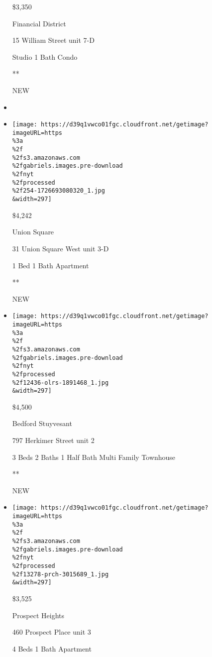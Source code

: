 \begin{itemize}
  \$3,350

  Financial District

  15 William Street unit 7-D

  Studio \textbar{} 1 Bath \textbar{} Condo

  **

  NEW
\item
\item
  \href{/real-estate/usa/ny/new-york/union-square/homes-for-rent/31-union-square-west/254-1726693080320?}{}

  \texttt{[image: https://d39q1vwco01fgc.cloudfront.net/getimage?imageURL=https\\\%3a\\\%2f\\\%2fs3.amazonaws.com\\\%2fgabriels.images.pre-download\\\%2fnyt\\\%2fprocessed\\\%2f254-1726693080320\_1.jpg\\\&width=297]}

  \$4,242

  Union Square

  31 Union Square West unit 3-D

  1 Bed \textbar{} 1 Bath \textbar{} Apartment

  **

  NEW
\item
  \href{/real-estate/usa/ny/brooklyn/bedford-stuyvesant/homes-for-rent/797-herkimer-street/12436-OLRS-1891468?}{}

  \texttt{[image: https://d39q1vwco01fgc.cloudfront.net/getimage?imageURL=https\\\%3a\\\%2f\\\%2fs3.amazonaws.com\\\%2fgabriels.images.pre-download\\\%2fnyt\\\%2fprocessed\\\%2f12436-olrs-1891468\_1.jpg\\\&width=297]}

  \$4,500

  Bedford Stuyvesant

  797 Herkimer Street unit 2

  3 Beds \textbar{} 2 Baths \textbar{} 1 Half Bath \textbar{} Multi
  Family Townhouse

  **

  NEW
\item
  \href{/real-estate/usa/ny/brooklyn/prospect-heights/homes-for-rent/460-prospect-place/13278-PRCH-3015689?}{}

  \texttt{[image: https://d39q1vwco01fgc.cloudfront.net/getimage?imageURL=https\\\%3a\\\%2f\\\%2fs3.amazonaws.com\\\%2fgabriels.images.pre-download\\\%2fnyt\\\%2fprocessed\\\%2f13278-prch-3015689\_1.jpg\\\&width=297]}

  \$3,525

  Prospect Heights

  460 Prospect Place unit 3

  4 Beds \textbar{} 1 Bath \textbar{} Apartment


\end{itemize}

